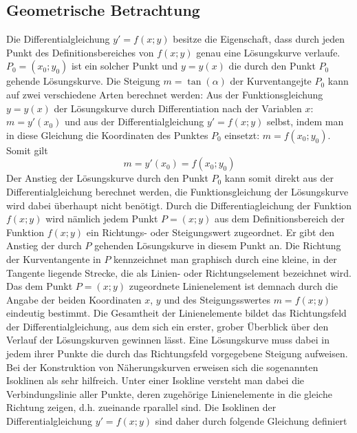 \subsection{Geometrische Betrachtung}
Die Differentialgleichung $y'=f\left(x; y\right)$ besitze die Eigenschaft, dass durch jeden Punkt des Definitionsbereiches von $f\left(x; y\right)$ genau eine Lösungskurve verlaufe. $P_0=\left(x_0; y_0\right)$ ist ein solcher Punkt und $y=y\left(x\right)$ die durch den Punkt $P_0$ gehende Lösungskurve.
\newline\newline
Die Steigung $m=\tan\left(\alpha\right)$ der Kurventangejte $P_0$ kann auf zwei verschiedene Arten berechnet werden: Aus der Funktionsgleichung $y=y\left(x\right)$ der Lösungskurve durch Differentiation nach der Variablen $x$: $m=y'\left(x_0\right)$ und aus der Differentialgleichung $y'=f\left(x; y\right)$ selbst, indem man in diese Gleichung die Koordinaten des Punktes $P_0$ einsetzt: $m=f\left(x_0; y_0\right)$. Somit gilt
\begin{equation}
\boxed{m=y'\left(x_0\right)=f\left(x_0; y_0\right)}
\end{equation}
Der Anstieg der Lösungskurve durch den Punkt $P_0$ kann somit direkt aus der Differentialgleichung berechnet werden, die Funktionsgleichung der Lösungskurve wird dabei überhaupt nicht benötigt. Durch die Differentiagleichung der Funktion $f\left(x; y\right)$ wird nämlich jedem Punkt $P=\left(x; y\right)$ aus dem Definitionsbereich der Funktion $f\left(x; y\right)$  ein Richtungs- oder Steigungswert zugeordnet. Er gibt den Anstieg der durch $P$ gehenden Lösungskurve in diesem Punkt an.
\newline\newline
Die Richtung der Kurventangente in $P$ kennzeichnet man graphisch durch eine kleine, in der Tangente liegende Strecke, die als Linien- oder Richtungselement bezeichnet wird. Das dem Punkt $P=\left(x; y\right)$ zugeordnete Linienelement ist demnach durch die Angabe der beiden Koordinaten $x$, $y$ und des Steigungsswertes $m=f\left(x; y\right)$ eindeutig bestimmt. Die Gesamtheit der Linienelemente bildet das Richtungsfeld der Differentialgleichung, aus dem sich ein erster, grober Überblick über den Verlauf der Lösungskurven gewinnen lässt. Eine Lösungskurve muss dabei in jedem ihrer Punkte die durch das Richtungsfeld vorgegebene Steigung aufweisen.
\newline\newline
Bei der Konstruktion von Näherungskurven erweisen sich die sogenannten Isoklinen als sehr hilfreich. Unter einer Isokline versteht man dabei die Verbindungslinie aller Punkte, deren zugehörige Linienelemente in die gleiche Richtung zeigen, d.h. zueinande rparallel sind. Die Isoklinen der Differentialgleichung $y'=f\left(x; y\right)$ sind daher durch folgende Gleichung definiert
